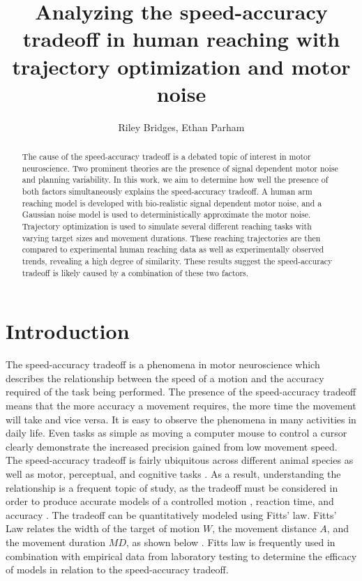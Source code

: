 \documentclass[letterpaper, 10pt, conference]{ieeeconf}
\title{\LARGE \bf Analyzing the speed-accuracy tradeoff in human reaching with trajectory optimization and motor noise}
\author{Riley Bridges, Ethan Parham}
\begin{document}
\maketitle
\thispagestyle{plain}
\pagestyle{plain}

\begin{abstract}
The cause of the speed-accuracy tradeoff is a debated topic of interest in motor neuroscience. Two prominent theories are the presence of signal dependent motor noise and planning variability. In this work, we aim to determine how well the presence of both factors simultaneously explains the speed-accuracy tradeoff. A human arm reaching model is developed with bio-realistic signal dependent motor noise, and a Gaussian noise model is used to deterministically approximate the motor noise. Trajectory optimization is used to simulate several different reaching tasks with varying target sizes and movement durations. These reaching trajectories are then compared to experimental human reaching data as well as experimentally observed trends, revealing a high degree of similarity. These results suggest the speed-accuracy tradeoff is likely caused by a combination of these two factors.
\end{abstract}

\section{Introduction}
The speed-accuracy tradeoff is a phenomena in motor neuroscience which describes the relationship between the speed of a motion and the accuracy required of the task being performed. The presence of the speed-accuracy tradeoff means that the more accuracy a movement requires, the more time the movement will take and vice versa. It is easy to observe the phenomena in many activities in daily life. Even tasks as simple as moving a computer mouse to control a cursor clearly demonstrate the increased precision gained from low movement speed. The speed-accuracy tradeoff is fairly ubiquitous across different animal species as well as motor, perceptual, and cognitive tasks \cite{c0}. As a result, understanding the relationship is a frequent topic of study, as the tradeoff must be considered in order to produce accurate models of a controlled motion \cite{c3}, reaction time, and accuracy \cite{c1.5}. The tradeoff can be quantitatively modeled using Fitts’ law. Fitts’ Law relates the width of the target of motion $W$, the movement distance $A$, and the movement duration $MD$, as shown below \cite{c1}. Fitts law is frequently used in combination with empirical data from laboratory testing to determine the efficacy of models in relation to the speed-accuracy tradeoff.  
\end{document}
